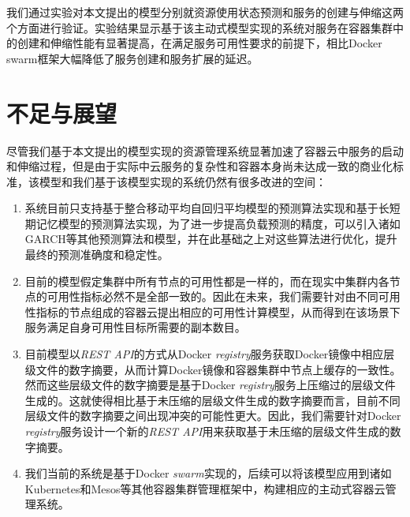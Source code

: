 我们通过实验对本文提出的模型分别就资源使用状态预测和服务的创建与伸缩这两个方面进行验证。实验结果显示基于该主动式模型实现的系统对服务在容器集群中的创建和伸缩性能有显著提高，在满足服务可用性要求的前提下，相比Docker swarm框架大幅降低了服务创建和服务扩展的延迟。

\section{不足与展望}
尽管我们基于本文提出的模型实现的资源管理系统显著加速了容器云中服务的启动和伸缩过程，但是由于实际中云服务的复杂性和容器本身尚未达成一致的商业化标准，该模型和我们基于该模型实现的系统仍然有很多改进的空间：
\begin{enumerate}
\item 系统目前只支持基于整合移动平均自回归平均模型的预测算法实现和基于长短期记忆模型的预测算法实现，为了进一步提高负载预测的精度，可以引入诸如GARCH等其他预测算法和模型，并在此基础之上对这些算法进行优化，提升最终的预测准确度和稳定性。
\item 目前的模型假定集群中所有节点的可用性都是一样的，而在现实中集群内各节点的可用性指标必然不是全部一致的。因此在未来，我们需要针对由不同可用性指标的节点组成的容器云提出相应的可用性计算模型，从而得到在该场景下服务满足自身可用性目标所需要的副本数目。
\item 目前模型以\emph{REST API}的方式从Docker \emph{registry}服务获取Docker镜像中相应层级文件的数字摘要，从而计算Docker镜像和容器集群中节点上缓存的一致性。然而这些层级文件的数字摘要是基于Docker \emph{registry}服务上压缩过的层级文件生成的。这就使得相比基于未压缩的层级文件生成的数字摘要而言，目前不同层级文件的数字摘要之间出现冲突的可能性更大。因此，我们需要针对Docker \emph{registry}服务设计一个新的\emph{REST API}用来获取基于未压缩的层级文件生成的数字摘要。
\item 我们当前的系统是基于Docker \emph{swarm}实现的，后续可以将该模型应用到诸如Kubernetes和Mesos等其他容器集群管理框架中，构建相应的主动式容器云管理系统。
\end{enumerate}
